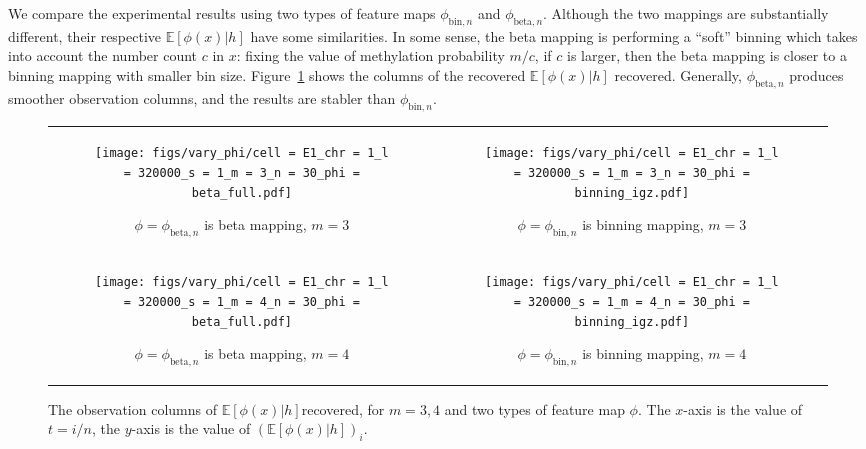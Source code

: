 \documentclass{article}
\def\E{\mathbb{E}}
\def\bin{\text{bin}}
\def\bet{\text{beta}}
\begin{document}
We compare the experimental results using two types of feature maps $\phi_{\bin, n}$ and $\phi_{\bet, n}$. Although the two mappings are substantially different, their respective $\E[\phi(x)|h]$ have some similarities. In some sense, the beta mapping is performing a ``soft'' binning which takes into account the number count $c$ in $x$: fixing the value of methylation probability $m/c$, if $c$ is larger, then the beta mapping is closer to a binning mapping with smaller bin size. Figure~\ref{fig:varyphi} shows the columns of the recovered $\E[\phi(x)|h]$ recovered. Generally, $\phi_{\bet, n}$ produces smoother observation columns, and the results are stabler than $\phi_{\bin, n}$.


\begin{figure}[H]
    \begin{tabular}{cc}
        \begin{subfigure}[t]{0.45\textwidth}
        \texttt{[image: figs/vary\_phi/cell = E1\_chr = 1\_l = 320000\_s = 1\_m = 3\_n = 30\_phi = beta\_full.pdf]}
        \caption{$\phi = \phi_{\bet, n}$ is beta mapping, $m = 3$}
    \end{subfigure}
    &
    \begin{subfigure}[t]{0.45\textwidth}
        \texttt{[image: figs/vary\_phi/cell = E1\_chr = 1\_l = 320000\_s = 1\_m = 3\_n = 30\_phi = binning\_igz.pdf]}
        \caption{$\phi = \phi_{\bin, n}$ is binning mapping, $m = 3$}
    \end{subfigure}
    \\
    \begin{subfigure}[t]{0.45\textwidth}
        \texttt{[image: figs/vary\_phi/cell = E1\_chr = 1\_l = 320000\_s = 1\_m = 4\_n = 30\_phi = beta\_full.pdf]}
        \caption{$\phi = \phi_{\bet, n}$ is beta mapping, $m = 4$}
    \end{subfigure}
    &
    \begin{subfigure}[t]{0.45\textwidth}
        \texttt{[image: figs/vary\_phi/cell = E1\_chr = 1\_l = 320000\_s = 1\_m = 4\_n = 30\_phi = binning\_igz.pdf]}
        \caption{$\phi = \phi_{\bin, n}$ is binning mapping, $m = 4$}
    \end{subfigure}
    \end{tabular}

    \caption{The observation columns of $\E[\phi(x)|h]$recovered, for $m = 3,4$ and two types of feature map $\phi$. The $x$-axis is the value of $t = i/n$, the $y$-axis is the value of $(\E[\phi(x)|h])_i$.}
    \label{fig:varyphi}
\end{figure}
\end{document}
